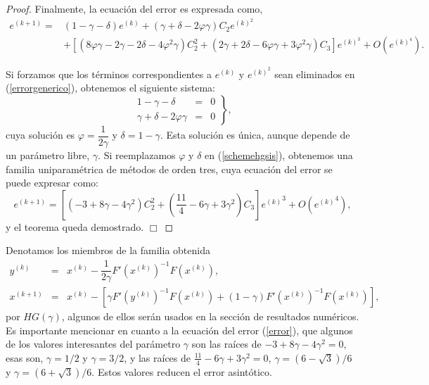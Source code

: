 \begin{proof}
	Finalmente, la ecuación del error es expresada como,
	\begin{align} \label{errorgenerico}
	e^{(k+1)} = & (1-\gamma-\delta)e^{(k)}+(\gamma+\delta-2\varphi\gamma)C_2e^{(k)^2}\\\nonumber &+\left[(8\varphi\gamma-2\gamma-2\delta-4\varphi^2\gamma)C_2^2+(2\gamma+2\delta-6\varphi\gamma+3\varphi^2\gamma)C_3\right]e^{(k)^3}+O(e^{(k)^4}).
	\end{align}
	
	Si forzamos que los términos correspondientes a $e^{(k)}$ y $e^{(k)^2}$ sean eliminados en (\ref{errorgenerico}), obtenemos el siguiente sistema:
	\begin{equation*}
	\left. \begin{array} {lcc}
	1- \gamma- \delta            &  = & 0 \\
	\gamma+\delta-2\varphi\gamma  &  = & 0
	\end{array} \right \},
	\end{equation*}
	cuya solución es $\varphi = \dfrac{1}{2\gamma}$ y  $\delta=1-\gamma$. Esta solución es única, aunque depende de un parámetro libre, $\gamma$. Si reemplazamos $\varphi$ y $\delta$ en (\ref{schemehgsis}), obtenemos una familia uniparamétrica de métodos de orden tres, cuya ecuación del error se puede expresar como:
	\begin{equation}\label{error}
	e^{(k+1)} = \left[ \left( -3+8\gamma-4\gamma^2 \right)C_2^2+\left( \frac{11}{4}-6\gamma+3\gamma^2\right)C_3 \right] {e^{(k)}}^3+O({e^{(k)}}^4),
	\end{equation}
	y el teorema queda demostrado. $\Box$
	\vspace{.5cm}
\end{proof}

Denotamos los miembros de la familia obtenida
\begin{equation} \label{HG}
\begin{array} {rcl}
y^{(k)}  & = & x^{(k)}- \dfrac{1}{2 \gamma} F'(x^{(k)})^{-1} F(x^{(k)}), \\
x^{(k+1)}& = & x^{(k)}-\left[ \gamma F'(y^{(k)})^{-1} F(x^{(k)})+ (1-\gamma) F'(x^{(k)})^{-1} F(x^{(k)}) \right],
\end{array}
\end{equation}
por $HG(\gamma)$, algunos de ellos serán usados en la sección de resultados numéricos. Es importante mencionar en cuanto a la ecuación del error (\ref{error}), que algunos de los valores interesantes del parámetro $\gamma$ son las raíces de $-3+8\gamma-4\gamma^2=0$, esas son, $\gamma=1/2$ y $\gamma=3/2$, y las raíces de $\frac{11}{4}-6\gamma+3\gamma^2=0$, $\gamma = (6-\sqrt{3})/6$ y $\gamma = (6+\sqrt{3})/6$. Estos valores reducen el error asintótico. 


